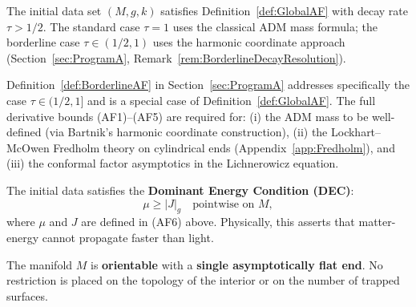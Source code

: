 \begin{assumption}\label{ass:AF}
The initial data set $(M,g,k)$ satisfies Definition~\ref{def:GlobalAF} with decay rate $\tau > 1/2$. The standard case $\tau = 1$ uses the classical ADM mass formula; the borderline case $\tau \in (1/2, 1)$ uses the harmonic coordinate approach (Section~\ref{sec:ProgramA}, Remark~\ref{rem:BorderlineDecayResolution}).
\end{assumption}

\begin{remark}
Definition~\ref{def:BorderlineAF} in Section~\ref{sec:ProgramA} addresses specifically the case $\tau \in (1/2, 1]$ and is a special case of Definition~\ref{def:GlobalAF}. The full derivative bounds (AF1)--(AF5) are required for: (i) the ADM mass to be well-defined (via Bartnik's harmonic coordinate construction), (ii) the Lockhart--McOwen Fredholm theory on cylindrical ends (Appendix~\ref{app:Fredholm}), and (iii) the conformal factor asymptotics in the Lichnerowicz equation.
\end{remark}

\begin{assumption}\label{ass:DEC}
The initial data satisfies the \textbf{Dominant Energy Condition (DEC)}:
\[
\mu \ge |J|_g \quad \text{pointwise on } M,
\]
where $\mu$ and $J$ are defined in (AF6) above. Physically, this asserts that matter-energy cannot propagate faster than light.
\end{assumption}

\begin{assumption}\label{ass:topology}
The manifold $M$ is \textbf{orientable} with a \textbf{single asymptotically flat end}. No restriction is placed on the topology of the interior or on the number of trapped surfaces.
\end{assumption}

